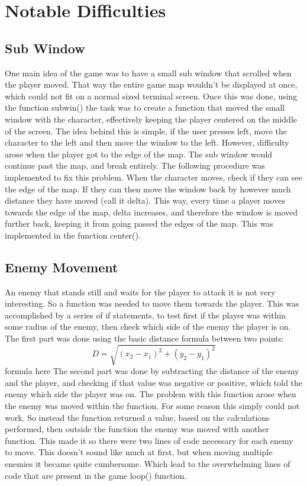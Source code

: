 \documentclass[11pt]{article}
\begin{document}
\section {Notable Difficulties}
\subsection{Sub Window}
One main idea of the game was to have a small sub window that scrolled when the player moved.  That way the entire game map wouldn’t be displayed at once, which could not fit on a normal sized terminal screen.  Once this was done, using the function subwin() the task was to create a function that moved the small window with the character, effectively keeping the player centered on the middle of the screen.  The idea behind this is simple, if the user presses left, move the character to the left and then move the window to the left.  However, difficulty arose when the player got to the edge of the map.  The sub window would continue past the map, and break entirely.  The following procedure was implemented to fix this problem.  When the character moves, check if they can see the edge of the map.  If they can then move the window back by however much distance they have moved (call it delta).  This way, every time a player moves towards the edge of the map, delta increases, and therefore the window is moved further back, keeping it from going passed the edges of the map.  This was implemented in the function center(). 
\subsection{Enemy Movement}
An enemy that stands still and waits for the player to attack it is not very interesting.  So a function was needed to move them towards the player.  This was accomplished by a series of if statements, to test first if the player was within some radius of the enemy, then check which side of the enemy the player is on.  The first part was done using the basic distance formula between two points:
\begin{equation}
D=\sqrt{(x_2-x_1)^2+(y_2-y_1)^2}
\end{equation}
 formula here The second part was done by subtracting the distance of the enemy and the player, and checking if that value was negative or positive, which told the enemy which side the player was on.  The problem with this function arose when the enemy was moved within the function.  For some reason this simply could not work.  So instead the function returned a value, based on the calculations performed, then outside the function the enemy was moved with another function.  This made it so there were two lines of code necessary for each enemy to move.  This doesn't sound like much at first, but when moving multiple enemies it became quite cumbersome.  Which lead to the overwhelming lines of code that are present in the game loop() function.
\end{document}
